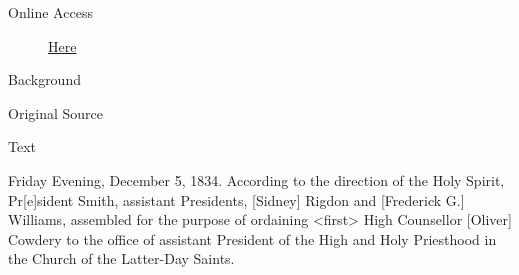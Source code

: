 				\begin{description}
					\item[Online Access] \href{https://www.josephsmithpapers.org/paper-summary/account-of-meetings-revelation-and-blessing-5-6-december-1834/1}{Here}
				\end{description}
				
				\begin{description}
					\item[Background]
				\end{description}
				
				
				\begin{description}
					\item[Original Source]
				\end{description}
				
				
				\begin{description}
					\item[Text]
				\end{description}
				

					Friday Evening, December 5, 1834. According to the direction of the Holy Spirit, Pr[e]sident Smith, assistant Presidents, [Sidney] Rigdon and [Frederick G.] Williams, assembled for the purpose of ordaining <first> High Counsellor [Oliver] Cowdery to the office of assistant President of the High and Holy Priesthood in the Church of the Latter-Day Saints.

